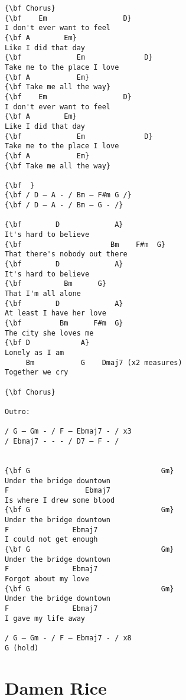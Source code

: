 \documentclass[a4paper]{article}
\begin{document}
\begin{Verbatim}[commandchars=\\\{\}]
{\bf Chorus}
{\bf    Em                  D}
I don't ever want to feel
{\bf A        Em}
Like I did that day
{\bf             Em              D}
Take me to the place I love
{\bf A           Em}
{\bf Take me all the way}
{\bf    Em                  D}
I don't ever want to feel
{\bf A        Em}
Like I did that day
{\bf             Em              D}
Take me to the place I love
{\bf A           Em}
{\bf Take me all the way}

{\bf  }
{\bf / D – A - / Bm – F#m G /}
{\bf / D – A - / Bm – G - /}

{\bf        D             A}
It's hard to believe
{\bf                     Bm    F#m  G}
That there's nobody out there
{\bf        D             A}
It's hard to believe
{\bf          Bm      G}
That I'm all alone
{\bf        D             A}
At least I have her love
{\bf         Bm      F#m  G}
The city she loves me
{\bf D            A}
Lonely as I am
     Bm           G    Dmaj7 (x2 measures)
Together we cry

{\bf Chorus}

Outro:

/ G – Gm - / F – Ebmaj7 - / x3
/ Ebmaj7 - - - / D7 – F - /


{\bf G                               Gm}
Under the bridge downtown
F                  Ebmaj7
Is where I drew some blood
{\bf G                               Gm}
Under the bridge downtown
F               Ebmaj7
I could not get enough
{\bf G                               Gm}
Under the bridge downtown
F               Ebmaj7
Forgot about my love
{\bf G                               Gm}
Under the bridge downtown
F               Ebmaj7
I gave my life away

/ G – Gm - / F – Ebmaj7 - / x8
G (hold)
\end{Verbatim}
\newpage
\section{Damen Rice} %
\label{sec:Damen Rice}
\end{document}
